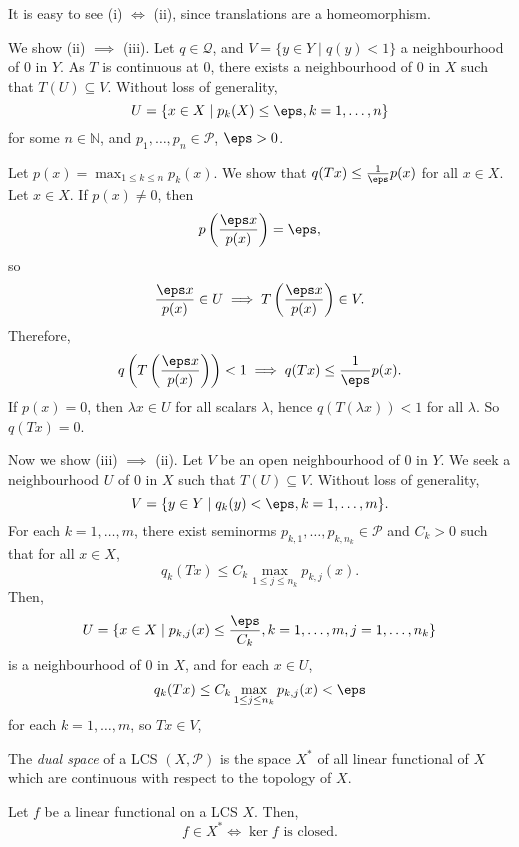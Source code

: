 \documentclass[12pt]{article}
\begin{document}
\begin{proofbox}
	It is easy to see (i) $\iff$ (ii), since translations are a homeomorphism.

	We show (ii) $\implies$ (iii). Let $q \in \mathcal{Q}$, and $V = \{y \in Y \mid q(y) < 1\}$ a neighbourhood of $0$ in $Y$. As $T$ is continuous at $0$, there exists a neighbourhood of 0 in $X$ such that $T(U) \subseteq V$. Without loss of generality,
	\[
		U = \{x \in X \mid p_k(X) \leq \eps, k = 1, \ldots, n\}
	\]
	for some $n \in \mathbb{N}$, and $p_1, \ldots, p_n \in \mathcal{P}$, $\eps > 0$.

	Let $p(x) = \max_{1 \leq k \leq n} p_k(x)$. We show that $q(Tx) \leq \frac{1}{\eps} p(x)$ for all $x \in X$. Let $x \in X$. If $p(x) \neq 0$, then
	\[
	p \left( \frac{\eps x}{p(x)} \right) = \eps,
	\]
	so
	\[
	\frac{\eps x}{p(x)} \in U \implies T \left( \frac{\eps x}{p(x)} \right) \in V.
	\]
	Therefore,
	\[
	q \left( T \left( \frac{\eps x}{ p(x)} \right) \right) < 1 \implies q(Tx) \leq \frac{1}{\eps} p(x).
	\]
	If $p(x) = 0$, then $\lambda x \in U$ for all scalars $\lambda$, hence $q(T(\lambda x)) < 1$ for all $\lambda$. So $q(Tx) = 0$.

	Now we show (iii) $\implies$ (ii). Let $V$ be an open neighbourhood of $0$ in $Y$. We seek a neighbourhood $U$ of $0$ in $X$ such that $T(U) \subseteq V$. Without loss of generality,
	\[
		V = \{y \in Y \mid q_k(y) < \eps, k = 1, \ldots, m\}.
	\]
	For each $k= 1, \ldots, m$, there exist seminorms $p_{k,1}, \ldots, p_{k,n_k} \in \mathcal{P}$ and $C_k > 0$ such that for all $x \in X$,
	\[
	q_k(Tx) \leq C_k \max_{1 \leq j \leq n_k} p_{k, j}(x).
	\]
	Then,
	\[
		U = \{x \in X \mid p_{k, j}(x) \leq \frac{\eps}{C_k}, k = 1, \ldots, m, j =1, \ldots, n_k \}
	\]
	is a neighbourhood of $0$ in $X$, and for each $x \in U$,
	\[
	q_k(Tx) \leq C_k \max_{1 \leq j \leq n_k} p_{k, j}(x) < \eps
	\]
	for each $k = 1, \ldots, m$, so $Tx \in V$,
\end{proofbox}

\begin{definition}
	The \emph{dual space} of a LCS $(X, \mathcal{P})$ is the space $X^\ast$ of all linear functional of $X$ which are continuous with respect to the topology of $X$.
\end{definition}

\begin{lemma}
	Let $f$ be a linear functional on a LCS $X$. Then,
	\[
		f \in X^\ast \iff \ker f\text { is closed}.
	\]
\end{lemma}
\end{document}
